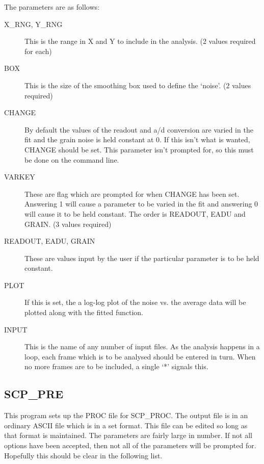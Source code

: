 The parameters are as follows:

\begin{description}

\item [X\_RNG, Y\_RNG] This is the range in X and Y to include in the analysis.
(2 values required for each)

\item [BOX] This is the size of the smoothing box used to define the `noise'.
(2 values required)

\item [CHANGE] By default the values of the readout and a/d conversion are
varied in the fit and the grain noise is held constant at 0. If this isn't what
is wanted, CHANGE should be set. This parameter isn't prompted for, so this
must be done on the command line.

\item [VARKEY] These are flag which are prompted for when CHANGE has been  set.
Answering 1 will cause a parameter to be varied in the fit and answering 0 will
cause it to be held constant.  The order is READOUT, EADU and GRAIN. (3 values
required)

\item [READOUT, EADU, GRAIN] These are values input by the user if the
particular parameter is to be held constant.

\item [PLOT] If this is set, the a log-log plot of the noise vs. the average
data will be plotted along with the fitted function.

\item [INPUT] This is the name of any number of input files. As the analysis
happens in a loop, each frame which is to be analysed should be entered in
turn.  When no more frames are to be included, a single `*' signals this.

\end{description}

\subsection{SCP\_PRE} \label{sec:proc_pars}

This program sets up the PROC file for SCP\_PROC.  The output file is in an
ordinary ASCII file which is in a set format.  This file can be edited so
long as that format is maintained.  The parameters are fairly large in
number.  If not all options have been accepted, then not all of the
parameters will be prompted for.  Hopefully this should be clear in the
following list.

